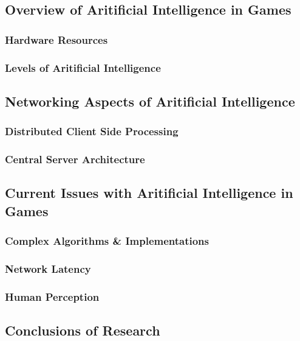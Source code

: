 \documentclass[12pt,a4paper,titlepage]{article}
\begin{document}
\subsection{Overview of Aritificial Intelligence in Games}

\subsubsection{Hardware Resources}

\subsubsection{Levels of Aritificial Intelligence}

\subsection{Networking Aspects of Aritificial Intelligence}

\subsubsection{Distributed Client Side Processing}

\subsubsection{Central Server Architecture}

\subsection{Current Issues with Aritificial Intelligence in Games}

\subsubsection{Complex Algorithms \& Implementations}

\subsubsection{Network Latency}

\subsubsection{Human Perception}

\subsection{Conclusions of Research}
\end{document}
